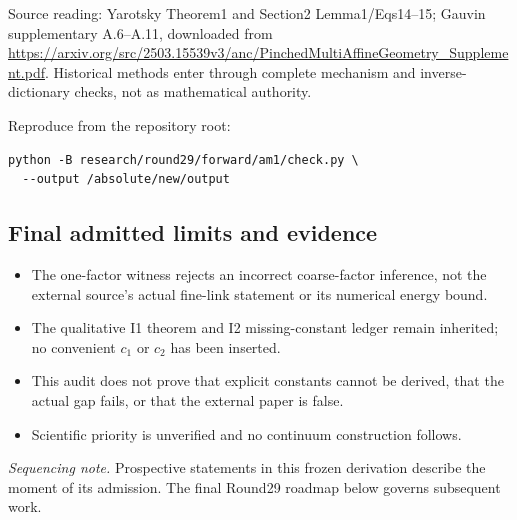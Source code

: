 Source reading: Yarotsky Theorem1 and Section2 Lemma1/Eqs14--15; Gauvin supplementary A.6--A.11, downloaded from \url{https://arxiv.org/src/2503.15539v3/anc/PinchedMultiAffineGeometry_Supplement.pdf}. Historical methods enter through complete mechanism and inverse-dictionary checks, not as mathematical authority.

Reproduce from the repository root:
\begin{verbatim}
python -B research/round29/forward/am1/check.py \
  --output /absolute/new/output
\end{verbatim}

\subsection*{Final admitted limits and evidence}
\begin{itemize}
\item The one-factor witness rejects an incorrect coarse-factor inference, not the external source's actual fine-link statement or its numerical energy bound.
\item The qualitative I1 theorem and I2 missing-constant ledger remain inherited; no convenient \(c_1\) or \(c_2\) has been inserted.
\item This audit does not prove that explicit constants cannot be derived, that the actual gap fails, or that the external paper is false.
\item Scientific priority is unverified and no continuum construction follows.
\end{itemize}
\par{}\par{}

\emph{Sequencing note.} Prospective statements in this frozen derivation describe the moment of its admission. The final Round29 roadmap below governs subsequent work.
